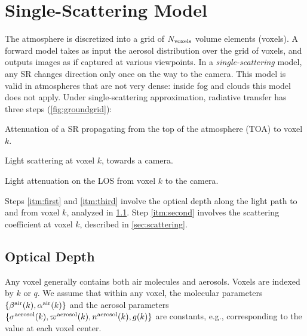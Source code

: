 \documentclass[10pt,letterpaper]{article}
\begin{document}

\section{Single-Scattering Model}
\label{sec:single-scatt-model}

The atmosphere is discretized into a grid of $N_{\rm voxels}$ volume
elements (voxels).  A forward model takes as input the aerosol
distribution over the grid of voxels, and outputs images as if
captured at various viewpoints.  In a \emph{single-scattering} model,
any SR changes direction only once on the way to the camera. This
model is valid in atmospheres that are not very dense: inside fog and
clouds this model does not apply.  Under single-scattering
approximation, radiative transfer has three steps
(\cref{fig:groundgrid}):
\begin{inparaenum}
\item \label{itm:first} Attenuation of a SR propagating from the top
  of the atmosphere (TOA) to voxel $k$.
\item \label{itm:second} Light scattering at voxel $k$, towards a
  camera.
\item \label{itm:third} Light attenuation on the LOS from voxel $k$ to
  the camera.
\end{inparaenum}
Steps \ref{itm:first} and \ref{itm:third} involve the optical depth
along the light path to and from voxel $k$, analyzed in
\cref{sec:optical-depth}.  Step \ref{itm:second} involves the
scattering coefficient at voxel $k$, described in
\cref{sec:scattering}.


\subsection{Optical Depth}
\label{sec:optical-depth}

Any voxel generally contains both air molecules and aerosols. Voxels
are indexed by $k$ or $q$. We assume that within any voxel, the
molecular parameters $\{ \beta^{\rm air}(k),\alpha^{\rm air}(k)\}$ and
the aerosol parameters $\{ \sigma^{\rm aerosol}(k),\varpi^{\rm
  aerosol}(k), n^{\rm aerosol}(k),g(k)\}$ are constants, e.g.,
corresponding to the value at each voxel center.
\end{document}
